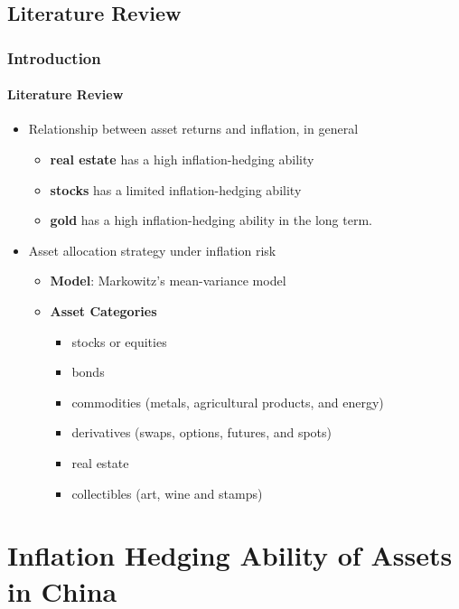 \documentclass[
	11pt, %
]{beamer}
\begin{document}
\subsection{Literature Review}
\begin{frame}
\frametitle{Introduction}
\framesubtitle{Literature Review}
\begin{itemize}
\item Relationship between asset returns and inflation, in general\\
    \begin{itemize}
    \item \textbf{real estate} has a high inflation-hedging ability
    \item \textbf{stocks} has a limited inflation-hedging ability
    \item \textbf{gold} has a high inflation-hedging ability in the long term. 
    \end{itemize}
\bigskip
\item Asset allocation strategy under inflation risk\\
    \begin{itemize}
    \item \textbf{Model}: Markowitz’s mean-variance model
    \item \textbf{Asset Categories}
        \begin{itemize}
            \item stocks or equities
            \item bonds
            \item commodities (metals, agricultural products, and energy)
            \item derivatives (swaps, options, futures, and spots)
            \item real estate
            \item collectibles (art, wine and stamps)
        \end{itemize}
    \end{itemize}
\end{itemize}
\end{frame}
\section{Inflation Hedging Ability of Assets in China}
\end{document}
